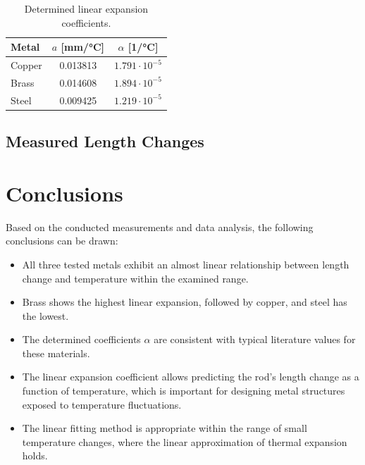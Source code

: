 \documentclass[a4paper,12pt]{article}
\begin{document}
\begin{table}[H]
\centering
\begin{tabular}{l c c}
\toprule
Metal & $a$ [mm/°C] & $\alpha$ [1/°C] \\
\midrule
Copper & 0.013813 & $1.791 \cdot 10^{-5}$ \\
Brass  & 0.014608 & $1.894 \cdot 10^{-5}$ \\
Steel  & 0.009425 & $1.219 \cdot 10^{-5}$ \\
\bottomrule
\end{tabular}
\caption{Determined linear expansion coefficients.}
\end{table}

\subsection*{Measured Length Changes}

\begin{table}[h]
\centering
{}
\caption{Measured length changes for all three metals.}
\end{table}

\section{Conclusions}

Based on the conducted measurements and data analysis, the following conclusions can be drawn:

\begin{itemize}
    \item All three tested metals exhibit an almost linear relationship between length change and temperature within the examined range.
    \item Brass shows the highest linear expansion, followed by copper, and steel has the lowest.
    \item The determined coefficients $\alpha$ are consistent with typical literature values for these materials.
    \item The linear expansion coefficient allows predicting the rod's length change as a function of temperature, which is important for designing metal structures exposed to temperature fluctuations.
    \item The linear fitting method is appropriate within the range of small temperature changes, where the linear approximation of thermal expansion holds.
\end{itemize}
\end{document}
